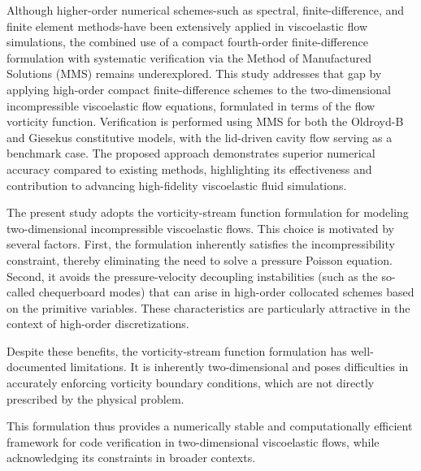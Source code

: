 \documentclass[preprint, 12pt]{elsarticle}
\begin{document}
{\color{red} Although higher-order numerical schemes-such as spectral,
finite-di\-ffe\-ren\-ce, and finite element methods-have been extensively
applied in viscoelastic flow simulations, the combined use of a compact
fourth-order finite-difference formulation with systematic verification via the
Method of Manufactured Solutions (MMS) remains underexplored. This study
addresses that gap by applying high-order compact finite-difference schemes to
the two-dimensional incompressible viscoelastic flow equations, formulated in
terms of the flow vorticity function. Verification is performed using MMS for
both the Oldroyd-B and Giesekus constitutive models, with the lid-driven cavity
flow serving as a benchmark case. The proposed approach demonstrates superior
numerical accuracy compared to existing methods, highlighting its effectiveness
and contribution to advancing high-fidelity viscoelastic fluid simulations.

The present study adopts the vorticity-stream function formulation for modeling
two-dimensional incompressible viscoelastic flows. This choice is motivated by
several factors. First, the formulation inherently satisfies the
incompressibility constraint, thereby eliminating the need to solve a pressure
Poisson equation. Second, it avoids the pressure-velocity decoupling
instabilities (such as the so-called chequerboard modes) that can arise in
high-order collocated schemes based on the primitive variables. These
characteristics are particularly attractive in the context of high-order
discretizations.

Despite these benefits, the vorticity-stream function formulation has
well-documented limitations. It is inherently two-dimensional and poses
difficulties in accurately enforcing vorticity boundary conditions, which are
not directly prescribed by the physical problem.

This formulation thus provides a numerically stable and computationally
efficient framework for code verification in two-dimensional viscoelastic
flows, while acknowledging its constraints in broader contexts.}
\end{document}
